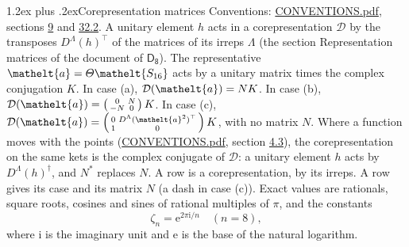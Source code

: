 \documentclass[10pt,a4paper]{article}
\makeatletter
\renewcommand\section{\@startsection{section}{1}{\z@}{-3ex plus -1ex minus -.2ex}%
  {1.2ex plus .2ex}{\normalfont\large\sffamily\bfseries\color{parttitle}}}
\numberwithin{equation}{section}
\newcommand{\eltfont}[1]{{\let\sigma\eltsigma\mathelt{#1}}}
\newcommand{\grp}[1]{\mathsf{#1}}
\newcommand{\elt}[1]{\eltfont{#1}}
\newcommand{\iunit}{\mathrm{i}}
\newcommand{\expe}{\mathrm{e}}
\newcommand{\rootunity}[1]{\zeta_{#1}}
\makeatother
\begin{document}
\section{Corepresentation matrices}\label{s:corep_matrices}
Conventions: \href{../../CONVENTIONS.pdf}{CONVENTIONS.pdf}, sections \href{../../../rotation/CONVENTIONS.pdf\#conv.9}{9} and \href{../../CONVENTIONS.pdf\#conv.32.2}{32.2}.
A unitary element $h$ acts in a corepresentation $\mathcal{D}$ by the transposes $D^{\Lambda}(h)^{\top}$ of the matrices of its irreps $\Lambda$ (the section Representation matrices of the document of \href{../../../rotation/data/pdf/D8.pdf}{$\grp{D_{8}}$}). The representative $\elt{a} = \varTheta\elt{S_{16}}$ acts by a unitary matrix times the complex conjugation $K$.
In case (a), $\mathcal{D}(\elt{a}) = NK$. In case (b), $\mathcal{D}(\elt{a}) = \left(\begin{smallmatrix} 0 & N \\ -N & 0 \end{smallmatrix}\right) K$. In case (c), $\mathcal{D}(\elt{a}) = \left(\begin{smallmatrix} 0 & D^{\Lambda}(\elt{a}^2)^{\top} \\ 1 & 0 \end{smallmatrix}\right) K$, with no matrix $N$.
Where a function moves with the points (\href{../../CONVENTIONS.pdf}{CONVENTIONS.pdf}, section \href{../../../rotation/CONVENTIONS.pdf\#conv.4.3}{4.3}), the corepresentation on the same kets is the complex conjugate of $\mathcal{D}$: a unitary element $h$ acts by $D^{\Lambda}(h)^{\dagger}$, and $N^{*}$ replaces $N$.
A row is a corepresentation, by its irreps. A row gives its case and its matrix $N$ (a dash in case (c)).
\leavevmode\label{n:constant.root}\label{n:index.root.order}Exact values are rationals, square roots, cosines and sines of rational multiples of $\pi$, and the constants
\begin{equation}\label{e:constants}\rootunity{n} = \expe^{2\pi\iunit/n}\quad(n = 8),\end{equation}
where $\iunit$ is the imaginary unit and $\expe$ is the base of the natural logarithm.
\end{document}
